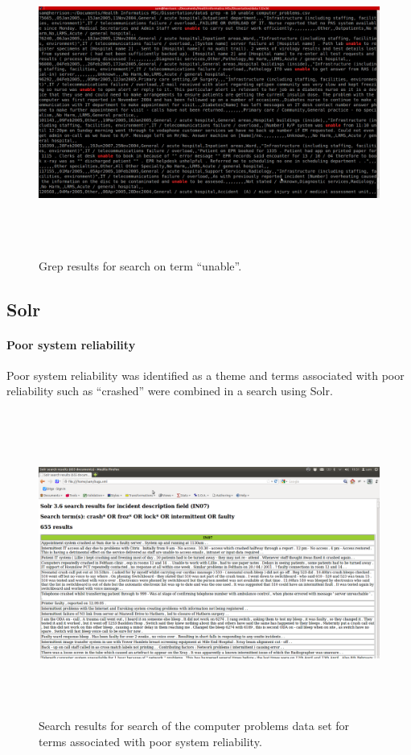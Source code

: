 \begin{figure}[htp]
\centering
\includegraphics[width=15cm,height=10cm]{figs/grepunable10.png}
\caption{Grep results for search on term ``unable''.}\label{fig:bugsd}
\end{figure}



\subsection{Solr}

\paragraph{Poor system reliability}

Poor system reliability was identified as a theme and terms associated with poor reliability such as ``crashed'' were combined in a search using Solr.

\begin{figure}[htp]
\centering
\includegraphics[width=15cm,height=10cm]{figs/bugs.png}
\caption{Search results for search of the computer problems data set for terms associated with poor system reliability.}\label{fig:bugs}
\end{figure}


